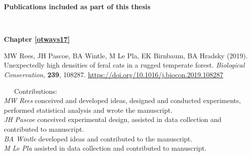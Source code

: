 \documentclass[11pt,a4paper,titlepage,twoside,openright]{style/unimelbthesis}
\begin{document}
\begin{frontmatter}
\begin{preface}
    \newpage
    
    \textbf{Publications included as part of this thesis}
    
    \(~\)
    
    \textbf{Chapter \ref{otways17}}
    
    MW Rees, JH Pascoe, BA Wintle, M Le Pla, EK Birnbaum, BA Hradsky (2019). Unexpectedly high densities of feral cats in a rugged temperate forest. \emph{Biological Conservation}, \textbf{239}, 108287. \url{https://doi.org/10.1016/j.biocon.2019.108287}
    
    ~~~Contributions:\\
    \hspace*{0.333em}\hspace*{0.333em}\hspace*{0.333em}\hspace*{0.333em}\hspace*{0.333em}\hspace*{0.333em}\hspace*{0.333em}\hspace*{0.333em}\emph{MW Rees} conceived and developed ideas, designed and conducted experiments, performed statistical analysis and wrote the manuscript.\\
    \hspace*{0.333em}\hspace*{0.333em}\hspace*{0.333em}\hspace*{0.333em}\hspace*{0.333em}\hspace*{0.333em}\hspace*{0.333em}\hspace*{0.333em}\emph{JH Pascoe} conceived experimental design, assisted in data collection and contributed to manuscript.\\
    \hspace*{0.333em}\hspace*{0.333em}\hspace*{0.333em}\hspace*{0.333em}\hspace*{0.333em}\hspace*{0.333em}\hspace*{0.333em}\hspace*{0.333em}\emph{BA Wintle} developed ideas and contributed to the manuscript.\\
    \hspace*{0.333em}\hspace*{0.333em}\hspace*{0.333em}\hspace*{0.333em}\hspace*{0.333em}\hspace*{0.333em}\hspace*{0.333em}\hspace*{0.333em}\emph{M Le Pla} assisted in data collection and contributed to manuscript.\\

\end{preface}
\end{frontmatter}
\end{document}
